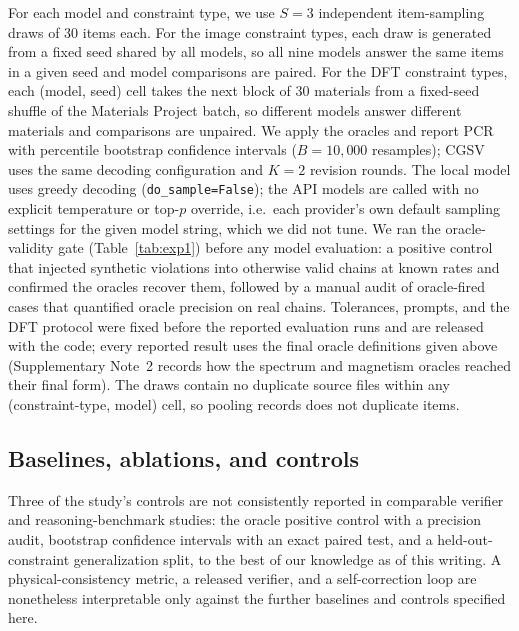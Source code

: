 \documentclass[pdflatex,sn-nature]{sn-jnl}
\newcommand{\rev}[1]{#1}
\newcommand{\rev}[1]{{\color{blue}#1}}
\begin{document}
For each model and constraint type, we use $S=3$ independent item-sampling
draws\rev{ of 30 items each. For the image constraint types, each draw is generated from a fixed
seed shared by all models, so all nine models answer the same items in a given seed and model
comparisons are paired. For the DFT constraint types, each (model, seed) cell takes the next
block of 30 materials from a fixed-seed shuffle of the Materials Project batch, so different
models answer different materials and comparisons are unpaired.} We apply the oracles and report
PCR with percentile bootstrap confidence intervals ($B=10{,}000$ resamples);
CGSV uses the same decoding configuration and $K=2$ revision rounds. The local model uses greedy decoding (\texttt{do\_sample=False}); the API models are called with no explicit temperature or top-$p$ override, i.e.\ each provider's own default sampling settings for the given model string, which we did not tune. We ran the oracle-validity gate (Table~\ref{tab:exp1}) \rev{before any model evaluation}: a positive control that injected synthetic violations into otherwise valid chains at known rates and confirmed the oracles recover them, followed by a manual audit of oracle-fired cases that quantified oracle precision on real chains. Tolerances, prompts, and the DFT protocol were fixed before the \rev{reported} evaluation runs and are released with the code\rev{; every reported result uses the final oracle definitions given above (Supplementary Note~2 records how the spectrum and magnetism oracles reached their final form)}. The draws contain no duplicate source files within
any (constraint-type, model) cell, so pooling records does not duplicate items.

\subsection*{Baselines, ablations, and controls}
Three of the study's controls are not consistently reported in comparable
verifier and reasoning-benchmark studies: the oracle positive control with a
precision audit, bootstrap confidence intervals with an exact paired test, and a
held-out-constraint generalization split, to the best of our knowledge as of this
writing. A physical-consistency metric, a released verifier, and a
self-correction loop are nonetheless interpretable only against the further
baselines and controls specified here.
\end{document}
